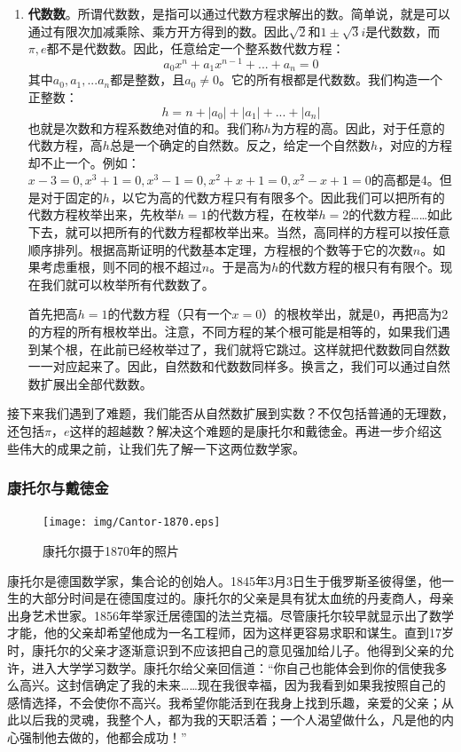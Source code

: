 \documentclass{article}
\begin{document}
\begin{enumerate}
\item \textbf{代数数}。所谓代数数，是指可以通过代数方程求解出的数。简单说，就是可以通过有限次加减乘除、乘方开方得到的数。因此$\sqrt{2}$和$1 \pm \sqrt{3}i$是代数数，而$\pi, e$都不是代数数。因此，任意给定一个整系数代数方程：
\[
a_0 x^n + a_1 x^{n-1} + ... + a_n = 0
\]
其中$a_0, a_1, ... a_n$都是整数，且$a_0 \neq 0$。它的所有根都是代数数。我们构造一个正整数：
\[
h = n + |a_0| + |a_1| + ... + |a_n|
\]
也就是次数和方程系数绝对值的和。我们称$h$为方程的高。因此，对于任意的代数方程，高$h$总是一个确定的自然数。反之，给定一个自然数$h$，对应的方程却不止一个。例如：$x - 3 = 0, x^3 + 1 = 0, x^3 - 1 = 0, x^2 + x + 1 = 0, x^2 - x + 1 = 0$的高都是4。但是对于固定的$h$，以它为高的代数方程只有有限多个。因此我们可以把所有的代数方程枚举出来，先枚举$h=1$的代数方程，在枚举$h=2$的代数方程……如此下去，就可以把所有的代数方程都枚举出来。当然，高同样的方程可以按任意顺序排列。根据高斯证明的代数基本定理，方程根的个数等于它的次数$n$。如果考虑重根，则不同的根不超过$n$。于是高为$h$的代数方程的根只有有限个。现在我们就可以枚举所有代数数了。

首先把高$h=1$的代数方程（只有一个$x = 0$）的根枚举出，就是0，再把高为2的方程的所有根枚举出。注意，不同方程的某个根可能是相等的，如果我们遇到某个根，在此前已经枚举过了，我们就将它跳过。这样就把代数数同自然数一一对应起来了。因此，自然数和代数数同样多。换言之，我们可以通过自然数扩展出全部代数数。
\end{enumerate}

接下来我们遇到了难题，我们能否从自然数扩展到实数？不仅包括普通的无理数，还包括$\pi$，$e$这样的超越数？解决这个难题的是康托尔和戴徳金。再进一步介绍这些伟大的成果之前，让我们先了解一下这两位数学家。

\subsubsection{康托尔与戴徳金}

\begin{figure}
 \centering
 \texttt{[image: img/Cantor-1870.eps]}
 \captionsetup{labelformat=empty}
 \caption{康托尔摄于1870年的照片}
 \label{fig:Cantor-1870}
\end{figure}

康托尔是德国数学家，集合论的创始人。1845年3月3日生于俄罗斯圣彼得堡，他一生的大部分时间是在德国度过的。康托尔的父亲是具有犹太血统的丹麦商人，母亲出身艺术世家。1856年举家迁居德国的法兰克福。尽管康托尔较早就显示出了数学才能，他的父亲却希望他成为一名工程师，因为这样更容易求职和谋生。直到17岁时，康托尔的父亲才逐渐意识到不应该把自己的意见强加给儿子。他得到父亲的允许，进入大学学习数学。康托尔给父亲回信道：“你自己也能体会到你的信使我多么高兴。这封信确定了我的未来……现在我很幸福，因为我看到如果我按照自己的感情选择，不会使你不高兴。我希望你能活到在我身上找到乐趣，亲爱的父亲；从此以后我的灵魂，我整个人，都为我的天职活着；一个人渴望做什么，凡是他的内心强制他去做的，他都会成功！”\cite{HanXueTao16}
\end{document}
